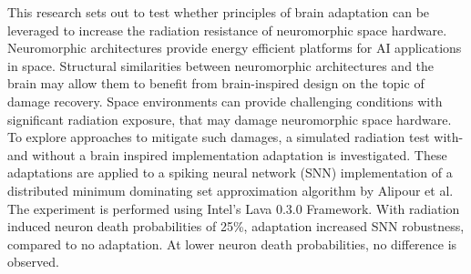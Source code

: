   This research sets out to test whether principles of brain adaptation can be leveraged to increase the radiation resistance of neuromorphic space hardware. Neuromorphic architectures provide energy efficient platforms for AI applications in space. Structural similarities between neuromorphic architectures and the brain may allow them to benefit from brain-inspired design on the topic of damage recovery. Space environments can provide challenging conditions with significant radiation exposure, that may damage neuromorphic space hardware. To explore approaches to mitigate such damages, a simulated radiation test with- and without a brain inspired implementation adaptation is investigated. These adaptations are applied to a spiking neural network (SNN) implementation of a distributed minimum dominating set approximation algorithm by Alipour et al. The experiment is performed using Intel's Lava 0.3.0 Framework. With radiation induced neuron death probabilities of 25\%, adaptation increased SNN robustness, compared to no adaptation. At lower neuron death probabilities, no difference is observed.
